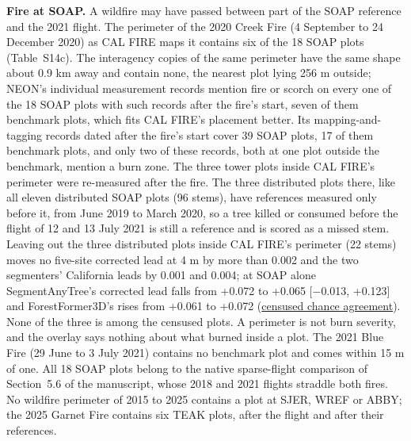 \documentclass[10pt,a4paper]{article}
\begin{document}
\textbf{Fire at SOAP.} A wildfire may have passed between part of the SOAP reference
and the 2021 flight. The perimeter of the 2020 Creek Fire (4 September to 24
December 2020) as CAL FIRE maps it contains six of the 18 SOAP plots (Table~S14c). The interagency copies of the same perimeter have the same shape about
0.9 km away and contain none, the nearest plot lying 256 m outside; NEON's
individual measurement records mention fire or scorch on every one of the 18
SOAP plots with such records after the fire's start, seven of them benchmark
plots, which fits CAL FIRE's placement better. Its mapping-and-tagging records
dated after the fire's start cover 39 SOAP plots, 17 of them benchmark plots,
and only two of these records, both at one plot outside the benchmark, mention
a burn zone. The three tower plots inside CAL FIRE's perimeter were re-measured
after the fire. The three distributed plots there, like all eleven distributed
SOAP plots (96 stems), have references measured only before it, from June 2019
to March 2020, so a tree killed or consumed before the flight of 12 and 13 July
2021 is still a reference and is scored as a missed stem. Leaving out the three
distributed plots inside CAL FIRE's perimeter (22 stems) moves no five-site
corrected lead at 4 m by more than 0.002 and the two segmenters' California
leads by 0.001 and 0.004; at SOAP alone SegmentAnyTree's corrected lead falls
from +0.072 to +0.065 [$-$0.013, +0.123] and ForestFormer3D's rises from +0.061 to
+0.072 (\href{https://github.com/devakellc/lidar-tree-benchmark/blob/main/results/censused-chance-agreement-results.md}{censused chance
agreement}). None of the three
is among the censused plots. A perimeter is not burn severity, and the overlay
says nothing about what burned inside a plot. The 2021 Blue Fire (29 June to 3
July 2021) contains no benchmark plot and comes within 15 m of one. All 18 SOAP
plots belong to the native sparse-flight comparison of Section~5.6 of the
manuscript, whose 2018 and 2021 flights straddle both fires. No wildfire
perimeter of 2015 to 2025 contains a plot at SJER, WREF or ABBY; the 2025 Garnet
Fire contains six TEAK plots, after the flight and after their references.
\end{document}
